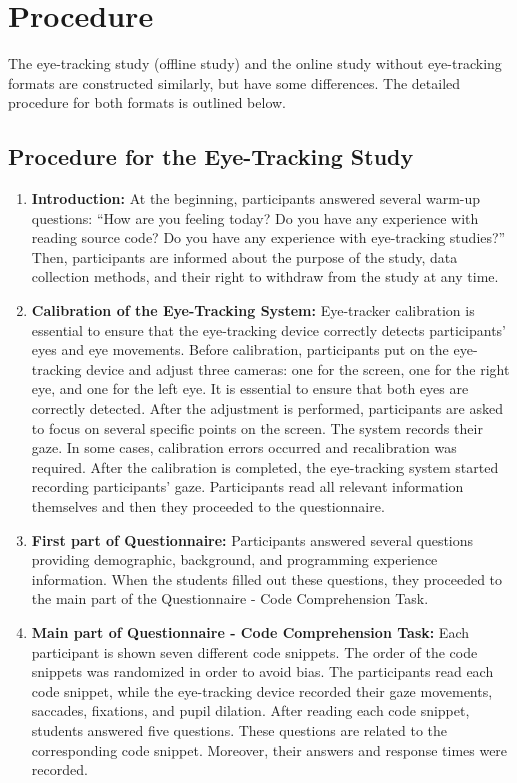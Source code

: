  
\section{Procedure}

The eye-tracking study (offline study) and the online study without eye-tracking formats are constructed similarly, but have some differences. The detailed procedure for both formats is outlined below.

\subsection{Procedure for the Eye-Tracking Study}




\begin{enumerate}
    \item \textbf{Introduction:} At the beginning, participants answered several warm-up questions: “How are you feeling today? Do you have any experience with reading source code? Do you have any experience with eye-tracking studies?”  Then, participants are informed about the purpose of the study, data collection methods, and their right to withdraw from the study at any time.

    \item \textbf{Calibration of the Eye-Tracking System:} 
    Eye-tracker calibration is essential to ensure that the eye-tracking device correctly detects participants’ eyes and eye movements. Before calibration, participants put on the eye-tracking device and adjust three cameras: one for the screen, one for the right eye, and one for the left eye. It is essential to ensure that both eyes are correctly detected. After the adjustment is performed, participants are asked to focus on several specific points on the screen. The system records their gaze. In some cases, calibration errors occurred and recalibration was required. After the calibration is completed, the eye-tracking system started recording participants’ gaze. Participants read all relevant information themselves and then they proceeded to the questionnaire.
    
    \item \textbf{First part of Questionnaire:}  
    Participants answered several questions providing demographic, background, and programming experience information. When the students filled out these questions, they proceeded to the main part of the Questionnaire - Code Comprehension Task.

    \item \textbf{Main part of Questionnaire - Code Comprehension Task:}  Each participant is shown seven different code snippets. The order of the code snippets was randomized in order to avoid bias. The participants read each code snippet, while the eye-tracking device recorded their gaze movements, saccades, fixations, and pupil dilation. After reading each code snippet, students answered five questions. These questions are related to the corresponding code snippet. Moreover, their answers and response times were recorded.


\end{enumerate}

